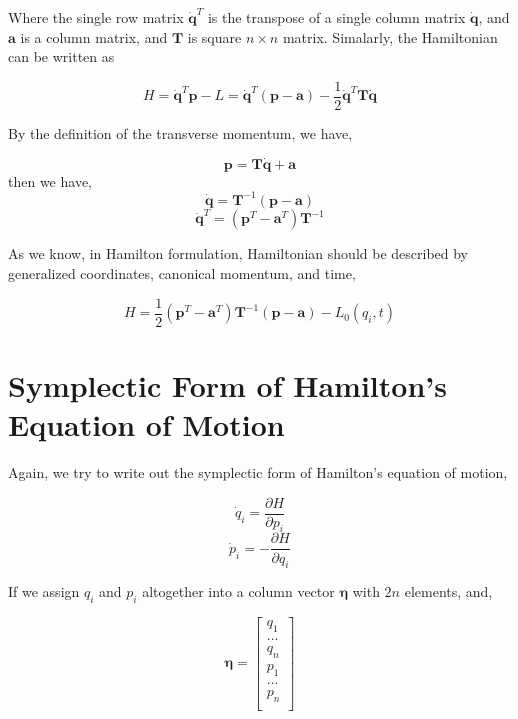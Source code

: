 \documentclass[12pt]{article}
\begin{document}
Where the single row matrix $\mathbf{\dot{q}}^T$ is the transpose of a single column matrix $\mathbf{\dot{q}}$, and $\mathbf{a}$ is a column matrix, and $\mathbf{T}$ is square $n \times n$ matrix.
Simalarly, the Hamiltonian can be written as 

\begin{center}
    \[ H = \mathbf{\dot{q}}^T\mathbf{p} - L = \mathbf{\dot{q}}^T(\mathbf{p} - \mathbf{a}) - \frac{1}{2}\mathbf{\dot{q}}^T\mathbf{T}\mathbf{\dot{q}} \]
\end{center}

By the definition of the transverse momentum, we have,

\begin{center}
    \[ \mathbf{p} = \mathbf{T\dot{q}} + \mathbf{a} \]
    then we have,
    \[ \mathbf{\dot{q}} = \mathbf{T}^{-1}(\mathbf{p-a}) \]
    \[ \mathbf{\dot{q}}^T = (\mathbf{p}^T - \mathbf{a}^T)\mathbf{T}^{-1} \]
\end{center}

As we know, in Hamilton formulation, Hamiltonian should be described by generalized coordinates, canonical momentum, and time,

\begin{center}
    \[ H = \frac{1}{2}(\mathbf{p}^T - \mathbf{a}^T) \mathbf{T}^{-1} (\mathbf{p} - \mathbf{a}) - L_0(q_i, t) \]
\end{center}

\section{Symplectic Form of Hamilton's Equation of Motion}

Again, we try to write out the symplectic form of Hamilton's equation of motion,

\begin{center}
    \[ \dot{q}_i = \frac{\partial H}{\partial p_i} \]
    \[ \dot{p}_i = -\frac{\partial H}{\partial q_i}\]
\end{center}

If we assign $q_i$ and $p_i$ altogether into a column vector $\pmb{\eta}$ with $2n$ elements, and,

\begin{center}
    \[ \pmb{\eta} = \begin{bmatrix}
        q_1\\
        ...\\
        q_n\\
        p_1\\
        ...\\
        p_n\\
    \end{bmatrix}\]
\end{center}
\end{document}
